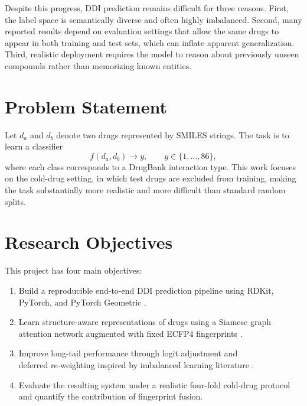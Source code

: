 \documentclass[12pt,a4paper]{report}
\begin{document}
Despite this progress, DDI prediction remains difficult for three reasons. First, the label space is semantically diverse and often highly imbalanced. Second, many reported results depend on evaluation settings that allow the same drugs to appear in both training and test sets, which can inflate apparent generalization. Third, realistic deployment requires the model to reason about previously unseen compounds rather than memorizing known entities.

\section{Problem Statement}
Let \(d_a\) and \(d_b\) denote two drugs represented by SMILES strings. The task is to learn a classifier
\begin{equation}
f(d_a, d_b) \rightarrow y, \qquad y \in \{1,\dots,86\},
\end{equation}
where each class corresponds to a DrugBank interaction type. This work focuses on the cold-drug setting, in which test drugs are excluded from training, making the task substantially more realistic and more difficult than standard random splits.

\section{Research Objectives}
This project has four main objectives:
\begin{enumerate}
    \item Build a reproducible end-to-end DDI prediction pipeline using RDKit, PyTorch, and PyTorch Geometric \cite{fey2019pyg}.
    \item Learn structure-aware representations of drugs using a Siamese graph attention network \cite{velickovic2018gat} augmented with fixed ECFP4 fingerprints \cite{rogers2010ecfp}.
    \item Improve long-tail performance through logit adjustment \cite{menon2021logit} and\\ deferred re-weighting inspired by imbalanced learning literature \cite{cao2019ldam}.
    \item Evaluate the resulting system under a realistic four-fold cold-drug protocol and quantify the contribution of fingerprint fusion.
\end{enumerate}
\end{document}
